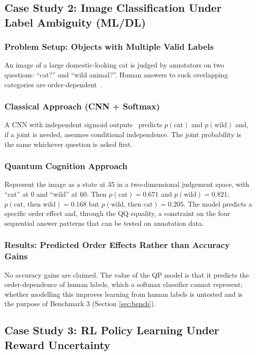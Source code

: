 \documentclass[pdflatex,sn-basic]{sn-jnl}
\begin{document}
\subsection{Case Study 2: Image Classification Under Label Ambiguity (ML/DL)}\label{sec:case-label}

\subsubsection{Problem Setup: Objects with Multiple Valid Labels}
An image of a large domestic-looking cat is judged by annotators on two questions: ``cat?'' and ``wild animal?''. Human answers to such overlapping categories are order-dependent~\citep{Wang2016}.

\subsubsection{Classical Approach (CNN + Softmax)}
A CNN with independent sigmoid outputs~\citep{Krizhevsky2012} predicts $p(\text{cat})$ and $p(\text{wild})$ and, if a joint is needed, assumes conditional independence. The joint probability is the same whichever question is asked first.

\subsubsection{Quantum Cognition Approach}
Represent the image as a state at 35\textdegree{} in a two-dimensional judgement space, with ``cat'' at 0\textdegree{} and ``wild'' at 60\textdegree{}. Then $p(\text{cat}) = 0.671$ and $p(\text{wild}) = 0.821$; $p(\text{cat, then wild}) = 0.168$ but $p(\text{wild, then cat}) = 0.205$. The model predicts a specific order effect and, through the QQ equality, a constraint on the four sequential answer patterns that can be tested on annotation data.

\subsubsection{Results: Predicted Order Effects Rather than Accuracy Gains}
No accuracy gains are claimed. The value of the QP model is that it predicts the order-dependence of human labels, which a softmax classifier cannot represent; whether modelling this improves learning from human labels is untested and is the purpose of Benchmark 3 (Section \ref{sec:bench}).

\subsection{Case Study 3: RL Policy Learning Under Reward Uncertainty}\label{sec:rl-exp}
\end{document}
